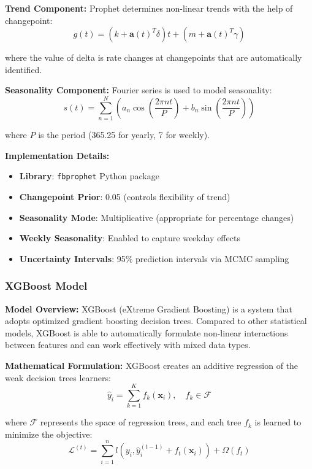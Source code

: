 \textbf{Trend Component:}
Prophet determines non-linear trends with the help of changepoint:
\begin{equation}
g(t) = (k + \mathbf{a}(t)^T\delta)t + (m + \mathbf{a}(t)^T\gamma)
\end{equation}

where the value of delta is rate changes at changepoints that are automatically identified.

\textbf{Seasonality Component:}
Fourier series is used to model seasonality:
\begin{equation}
s(t) = \sum_{n=1}^{N} \left( a_n \cos\left(\frac{2\pi nt}{P}\right) + b_n \sin\left(\frac{2\pi nt}{P}\right) \right)
\end{equation}

where $P$ is the period (365.25 for yearly, 7 for weekly).

\textbf{Implementation Details:}
\begin{itemize}
    \item \textbf{Library}: \texttt{fbprophet} Python package
    \item \textbf{Changepoint Prior}: 0.05 (controls flexibility of trend)
    \item \textbf{Seasonality Mode}: Multiplicative (appropriate for percentage changes)
    \item \textbf{Weekly Seasonality}: Enabled to capture weekday effects
    \item \textbf{Uncertainty Intervals}: 95\% prediction intervals via MCMC sampling
\end{itemize}

\subsubsection{XGBoost Model}

\textbf{Model Overview:}
XGBoost (eXtreme Gradient Boosting) is a system that adopts optimized gradient boosting decision trees. Compared to other statistical models, XGBoost is able to automatically formulate non-linear interactions between features and can work effectively with mixed data types.

\textbf{Mathematical Formulation:}
XGBoost creates an additive regression of the weak decision trees learners:
\begin{equation}
\hat{y}_i = \sum_{k=1}^{K} f_k(\mathbf{x}_i), \quad f_k \in \mathcal{F}
\end{equation}

where $\mathcal{F}$ represents the space of regression trees, and each tree $f_k$ is learned to minimize the objective:
\begin{equation}
\mathcal{L}^{(t)} = \sum_{i=1}^{n} l(y_i, \hat{y}_i^{(t-1)} + f_t(\mathbf{x}_i)) + \Omega(f_t)
\end{equation}

